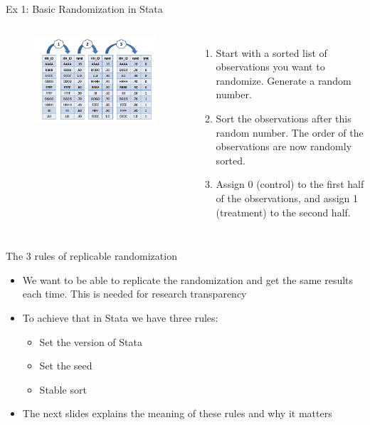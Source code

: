 \documentclass[aspectratio=169]{beamer}
\begin{document}
\begin{frame}[fragile]{Ex 1: Basic Randomization in Stata}
\begin{columns}[c]
	\begin{figure}
		\centering
		\includegraphics[width=\linewidth]{img/randomeg1}
	\end{figure}
	
	\begin{enumerate}
		\item \small Start with a sorted list of observations you want to randomize. Generate a random number.
		\item \small Sort the observations after this random number. The order of the observations are now randomly sorted.
		\item \small Assign 0 (control) to the first half of the observations, and assign 1 (treatment) to the second half.		
	\end{enumerate}
\end{columns}
\end{frame}


\begin{frame}{The 3 rules of replicable randomization}
\begin{itemize}
	\item We want to be able to replicate the randomization and get the same results each time. This is needed for research transparency
	\item To achieve that in Stata we have three rules:
		\begin{itemize}
			\item Set the version of Stata
			\item Set the seed 
			\item Stable sort
		\end{itemize}
	\item The next slides explains the meaning of these rules and why it matters
\end{itemize}
\end{frame}
\end{document}
